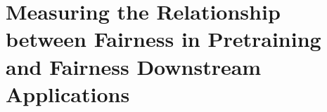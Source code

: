 \part{Measuring the Relationship between Fairness in Pretraining and Fairness Downstream Applications}\label{sec:measurement}